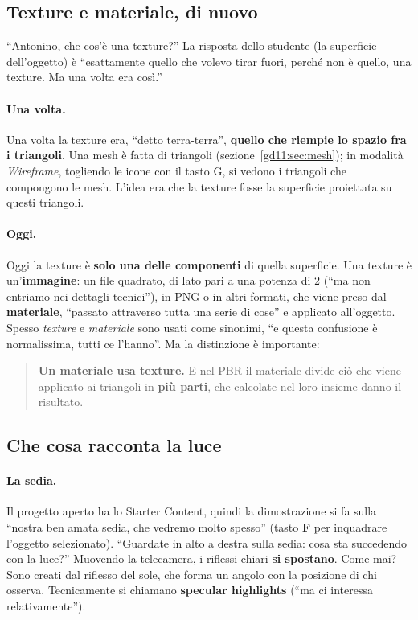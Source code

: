 \subsection{Texture e materiale, di nuovo}

``Antonino, che cos'è una texture?'' La risposta dello studente (la superficie
dell'oggetto) è ``esattamente quello che volevo tirar fuori, perché non è quello,
una texture. Ma una volta era così.''

\paragraph{Una volta.} Una volta la texture era, ``detto terra-terra'',
\textbf{quello che riempie lo spazio fra i triangoli}. Una mesh è fatta di
triangoli (sezione~\ref{gd11:sec:mesh}); in modalità \emph{Wireframe}, togliendo le
icone con il tasto G, si vedono i triangoli che compongono le mesh. L'idea era che
la texture fosse la superficie proiettata su questi triangoli.

\paragraph{Oggi.} Oggi la texture è \textbf{solo una delle componenti} di quella
superficie. Una texture è un'\textbf{immagine}: un file quadrato, di lato pari a
una potenza di 2 (``ma non entriamo nei dettagli tecnici''), in PNG o in altri
formati, che viene preso dal \textbf{materiale}, ``passato attraverso tutta una
serie di cose'' e applicato all'oggetto. Spesso \emph{texture} e \emph{materiale}
sono usati come sinonimi, ``e questa confusione è normalissima, tutti ce l'hanno''.
Ma la distinzione è importante:
\begin{quote}
\textbf{Un materiale usa texture.} E nel PBR il materiale divide ciò che viene
applicato ai triangoli in \textbf{più parti}, che calcolate nel loro insieme danno
il risultato.
\end{quote}

\subsection{Che cosa racconta la luce}

\paragraph{La sedia.} Il progetto aperto ha lo Starter Content, quindi la
dimostrazione si fa sulla ``nostra ben amata sedia, che vedremo molto spesso''
(tasto \textbf{F} per inquadrare l'oggetto selezionato). ``Guardate in alto a destra
sulla sedia: cosa sta succedendo con la luce?'' Muovendo la telecamera, i
riflessi chiari \textbf{si spostano}. Come mai? Sono creati dal riflesso del sole,
che forma un angolo con la posizione di chi osserva. Tecnicamente si chiamano
\textbf{specular highlights} (``ma ci interessa relativamente'').

